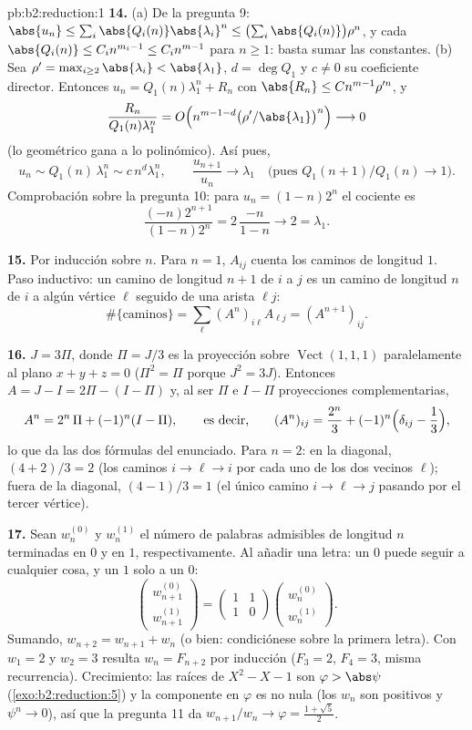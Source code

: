 \begin{solution}{pb:b2:reduction:1}
\textbf{14.} (a) De la pregunta 9: $\abs{u_n} \leq \sum_i
\abs{Q_i(n)}\abs{\lambda_i}^n \leq \bigl(\sum_i
\abs{Q_i(n)}\bigr)\rho^n$, y cada $\abs{Q_i(n)} \leq C_i n^{m_i -
1} \leq C_i n^{m-1}$ para $n \geq 1$: basta sumar las constantes.
(b) Sea $\rho' = \max_{i \geq 2}\abs{\lambda_i} <
\abs{\lambda_1}$, $d = \deg Q_1$ y $c \neq 0$ su coeficiente
director. Entonces $u_n = Q_1(n)\lambda_1^n + R_n$ con $\abs{R_n}
\leq Cn^{m-1}\rho'^n$, y
\[
\frac{R_n}{Q_1(n)\lambda_1^n} = O\Bigl(n^{m-1-d}
\bigl(\rho'/\abs{\lambda_1}\bigr)^n\Bigr) \longrightarrow 0
\]
(lo geométrico gana a lo polinómico). Así pues,
\[
u_n \sim Q_1(n)\,\lambda_1^n \sim c\,n^d\lambda_1^n,
\qquad
\frac{u_{n+1}}{u_n} \longrightarrow \lambda_1
\quad\text{(pues } Q_1(n{+}1)/Q_1(n) \to 1\text{)}.
\]
Comprobación sobre la pregunta 10: para $u_n = (1-n)2^n$ el
cociente es
\[
\frac{(-n)2^{n+1}}{(1-n)2^n} = 2\,\frac{-n}{1-n}
\longrightarrow 2 = \lambda_1 .
\]

\textbf{15.} Por inducción sobre $n$. Para $n = 1$, $A_{ij}$
cuenta los caminos de longitud $1$. Paso inductivo: un camino de
longitud $n + 1$ de $i$ a $j$ es un camino de longitud $n$ de $i$
a algún vértice $\ell$ seguido de una arista $\ell j$:
\[
\#\{\text{caminos}\} = \sum_{\ell} (A^n)_{i\ell}A_{\ell j} =
(A^{n+1})_{ij}.
\]

\textbf{16.} $J = 3\Pi$, donde $\Pi = J/3$ es la proyección sobre
$\operatorname{Vect}(1,1,1)$ paralelamente al plano $x + y + z =
0$ ($\Pi^2 = \Pi$ porque $J^2 = 3J$). Entonces $A = J - I = 2\Pi -
(I - \Pi)$ y, al ser $\Pi$ e $I - \Pi$ proyecciones
complementarias,
\[
A^n = 2^n\,\Pi + (-1)^n (I - \Pi),
\qquad\text{es decir,}\qquad
(A^n)_{ij} = \frac{2^n}3 + (-1)^n\Bigl(\delta_{ij} -
\frac13\Bigr),
\]
lo que da las dos fórmulas del enunciado. Para $n = 2$: en la
diagonal, $(4 + 2)/3 = 2$ (los caminos $i \to \ell \to i$ por cada
uno de los dos vecinos $\ell$); fuera de la diagonal, $(4 - 1)/3 =
1$ (el único camino $i \to \ell \to j$ pasando por el tercer
vértice).

\textbf{17.} Sean $w_n^{(0)}$ y $w_n^{(1)}$ el número de palabras
admisibles de longitud $n$ terminadas en $0$ y en $1$,
respectivamente. Al añadir una letra: un $0$ puede seguir a
cualquier cosa, y un $1$ solo a un $0$:
\[
\begin{pmatrix} w_{n+1}^{(0)}\\ w_{n+1}^{(1)}\end{pmatrix}
= \begin{pmatrix} 1 & 1\\ 1 & 0\end{pmatrix}
\begin{pmatrix} w_n^{(0)}\\ w_n^{(1)}\end{pmatrix}.
\]
Sumando, $w_{n+2} = w_{n+1} + w_n$ (o bien: condiciónese sobre la
primera letra). Con $w_1 = 2$ y $w_2 = 3$ resulta $w_n = F_{n+2}$
por inducción ($F_3 = 2$, $F_4 = 3$, misma recurrencia).
Crecimiento: las raíces de $X^2 - X - 1$ son $\varphi >
\abs\psi$ (\cref{exo:b2:reduction:5}) y la componente en $\varphi$
es no nula (los $w_n$ son positivos y $\psi^n \to 0$), así que la
pregunta 11 da $w_{n+1}/w_n \to \varphi = \frac{1 + \sqrt5}2$.


\end{solution}
